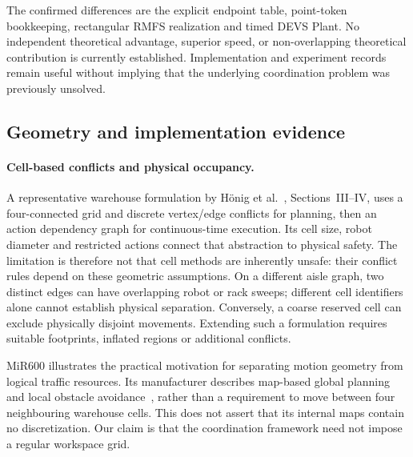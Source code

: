 \documentclass[11pt,a4paper]{article}
\theoremstyle{remark}
\begin{document}
The confirmed differences are the explicit endpoint table, point-token
bookkeeping, rectangular RMFS realization and timed DEVS Plant. No independent
theoretical advantage, superior speed, or non-overlapping theoretical
contribution is currently established. Implementation and experiment
records remain useful without implying that the underlying coordination
problem was previously unsolved.

\subsection{Geometry and implementation evidence}

\paragraph{Cell-based conflicts and physical occupancy.}
A representative warehouse formulation by H\"onig et al.~\cite{hoenig2019},
Sections~III--IV, uses a four-connected grid and discrete vertex/edge
conflicts for planning, then an action dependency graph for continuous-time
execution. Its cell size, robot diameter and restricted actions connect
that abstraction to physical safety. The limitation is therefore not that
cell methods are inherently unsafe: their conflict rules depend on these
geometric assumptions. On a different aisle graph, two distinct edges can
have overlapping robot or rack sweeps; different cell identifiers alone
cannot establish physical separation. Conversely, a coarse reserved cell
can exclude physically disjoint movements. Extending such a formulation
requires suitable footprints, inflated regions or additional conflicts.

MiR600 illustrates the practical motivation for separating motion geometry
from logical traffic resources. Its manufacturer describes map-based global
planning and local obstacle avoidance~\cite{mir600guide}, rather than a
requirement to move between four neighbouring warehouse cells. This does
not assert that its internal maps contain no discretization. Our claim is
that the coordination framework need not impose a regular workspace grid.
\end{document}
